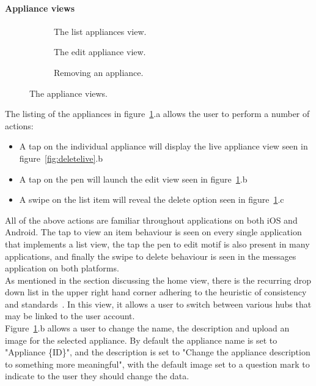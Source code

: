 \documentclass[draft,preprint,12pt,3p]{elsarticle}
\begin{document}
\paragraph{Appliance views}
\begin{figure}[H]
    \centering
    \begin{subfigure}[t]{0.32\columnwidth}
        \centering
        \caption{The list appliances view.}
    \end{subfigure}
    \begin{subfigure}[t]{0.32\columnwidth}
        \centering
        \caption{The edit appliance view.}
    \end{subfigure}
    \begin{subfigure}[t]{0.32\columnwidth}
        \centering
        \caption{Removing an appliance.}
    \end{subfigure}
    \caption{The appliance views.}
    \label{fig:fuseviews}
\end{figure}
The listing of the appliances in figure~\ref{fig:fuseviews}.a allows the user to perform a number of actions:
\begin{itemize}
\item A tap on the individual appliance will display the live appliance view seen in figure~\ref{fig:deletelive}.b
\item A tap on the pen will launch the edit view seen in figure~\ref{fig:fuseviews}.b
\item A swipe on the list item will reveal the delete option seen in figure~\ref{fig:fuseviews}.c
\end{itemize}
All of the above actions are familiar throughout applications on both iOS and Android. The tap to view an item behaviour is seen on every single application that implements a list view, the tap the pen to edit motif is also present in many applications, and finally the swipe to delete behaviour is seen in the messages application on both platforms.\\
As mentioned in the section discussing the home view, there is the recurring drop down list in the upper right hand corner adhering to the heuristic of consistency and standards~\cite{nielsen}. In this view, it allows a user to switch between various hubs that may be linked to the user account.\\
Figure~\ref{fig:fuseviews}.b allows a user to change the name, the description and upload an image for the selected appliance. By default the appliance name is set to "Appliance \{ID\}", and the description is set to "Change the appliance description to something more meaningful", with the default image set to a question mark to indicate to the user they should change the data.\\
\end{document}
